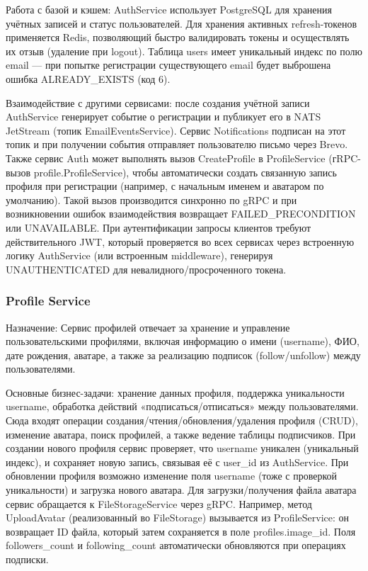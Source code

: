 Работа с базой и кэшем: AuthService использует PostgreSQL для хранения учётных записей и статус пользователей. Для хранения активных refresh-токенов применяется Redis, позволяющий быстро валидировать токены и осуществлять их отзыв (удаление при logout). Таблица users имеет уникальный индекс по полю email — при попытке регистрации существующего email будет выброшена ошибка ALREADY\_EXISTS (код 6).

Взаимодействие с другими сервисами: после создания учётной записи AuthService генерирует событие о регистрации и публикует его в NATS JetStream (топик EmailEventsService). Сервис Notifications подписан на этот топик и при получении события отправляет пользователю письмо через Brevo. Также сервис Auth может выполнять вызов CreateProfile в ProfileService (гRPC-вызов profile.ProfileService), чтобы автоматически создать связанную запись профиля при регистрации (например, с начальным именем и аватаром по умолчанию). Такой вызов производится синхронно по gRPC и при возникновении ошибок взаимодействия возвращает FAILED\_PRECONDITION или UNAVAILABLE. При аутентификации запросы клиентов требуют действительного JWT, который проверяется во всех сервисах через встроенную логику AuthService (или встроенным middleware), генерируя UNAUTHENTICATED для невалидного/просроченного токена.

\subsubsection*{Profile Service}
Назначение: Сервис профилей отвечает за хранение и управление пользовательскими профилями, включая информацию о имени (username), ФИО, дате рождения, аватаре, а также за реализацию подписок (follow/unfollow) между пользователями.

Основные бизнес-задачи: хранение данных профиля, поддержка уникальности username, обработка действий «подписаться/отписаться» между пользователями. Сюда входят операции создания/чтения/обновления/удаления профиля (CRUD), изменение аватара, поиск профилей, а также ведение таблицы подписчиков. При создании нового профиля сервис проверяет, что username уникален (уникальный индекс), и сохраняет новую запись, связывая её с user\_id из AuthService. При обновлении профиля возможно изменение поля username (тоже с проверкой уникальности) и загрузка нового аватара. Для загрузки/получения файла аватара сервис обращается к FileStorageService через gRPC. Например, метод UploadAvatar (реализованный во FileStorage) вызывается из ProfileService: он возвращает ID файла, который затем сохраняется в поле profiles.image\_id. Поля followers\_count и following\_count автоматически обновляются при операциях подписки.

